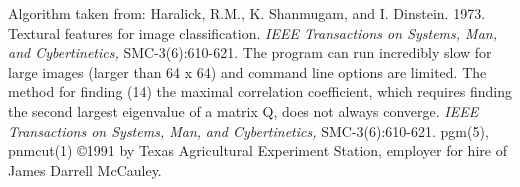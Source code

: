 \par
Algorithm taken from:
\nwl
Haralick, R.M., K. Shanmugam, and I. Dinstein. 1973. Textural features
for image classification.  
{\it IEEE Transactions on Systems, Man,}
{\it and Cybertinetics,}
SMC-3(6):610-621.
The program can run incredibly slow for large images (larger than 64 x 64)
and command line options are limited.
The method for finding (14) the maximal correlation coefficient, which
requires finding the second largest eigenvalue of a matrix Q, does not
always converge.
{\it IEEE Transactions on Systems, Man,}
{\it and Cybertinetics,}
SMC-3(6):610-621.
pgm(5), pnmcut(1)
\copyright 1991 by Texas Agricultural Experiment Station, employer for
hire of James Darrell McCauley. 
%
%
 
%

\newpage
%

